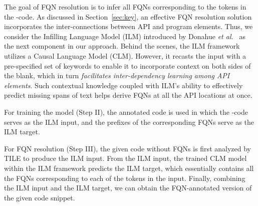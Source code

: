 
The goal of FQN resolution is to infer all FQNs corresponding to the
\blank tokens in the \blank-code. As discussed in
Section~\ref{sec:key}, an effective FQN resolution solution
incorporates the inter-connections between API and program
elements. Thus, we consider the Infilling Language Model (ILM)
introduced by Donahue {\em et al.}~\cite{donahue-etal-2020-enabling} as the next component in
our approach. 
Behind the scenes, the ILM framework utilizes a Causal Language Model (CLM).
However, it recasts the input with a pre-specified set of keywords to
enable it to incorporate context on both sides of the blank, which in
turn {\em facilitates inter-dependency learning among API elements}.
Such contextual knowledge coupled with ILM's ability to effectively
predict missing spans of text helps \tool derive FQNs at all the API
locations at once.

For training the model (Step II), the annotated code is 
used in which the \blank-code serves as the ILM input, and the prefixes
of the corresponding FQNs serve as the ILM target.

For FQN resolution (Step III), the given code without FQNs is first analyzed
by TILE to produce the ILM input. 
From the ILM input, the trained CLM model within the ILM framework predicts the ILM target, which essentially contains all the FQNs corresponding to each of the \blank tokens in the input.
Finally, combining the ILM input and the
ILM target, we can obtain the 
FQN-annotated version of the given code snippet.



